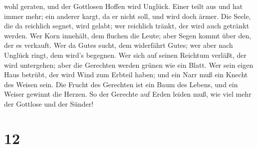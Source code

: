 wohl geraten, und der Gottlosen Hoffen wird Unglück.  Einer
teilt aus und hat immer mehr; ein anderer kargt, da er nicht soll, und
wird doch ärmer.  Die Seele, die da reichlich segnet, wird
gelabt; wer reichlich tränkt, der wird auch getränkt werden.
 Wer Korn innehält, dem fluchen die Leute; aber Segen kommt
über den, der es verkauft.  Wer da Gutes sucht, dem
widerfährt Gutes; wer aber nach Unglück ringt, dem wird's begegnen.
 Wer sich auf seinen Reichtum verläßt, der wird untergehen;
aber die Gerechten werden grünen wie ein Blatt.  Wer sein
eigen Haus betrübt, der wird Wind zum Erbteil haben; und ein Narr muß
ein Knecht des Weisen sein.  Die Frucht des Gerechten ist
ein Baum des Lebens, und ein Weiser gewinnt die Herzen.  So
der Gerechte auf Erden leiden muß, wie viel mehr der Gottlose und der
Sünder!

\hypertarget{section-11}{%
\section{12}\label{section-11}}

